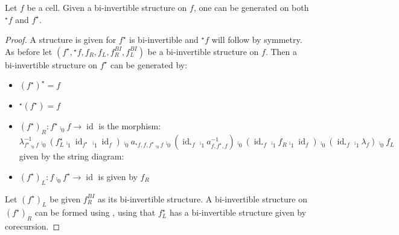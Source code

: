 \documentclass[draft]{article}
\theoremstyle{definition} \newtheorem{definition}{Definition}
\theoremstyle{remark} \newtheorem{remark}{Remark}
\DeclareMathOperator{\id}{id}
\newcommand{\linv}[1]{{}^\star\!#1} \newcommand{\rinv}[1]{#1^\star}
\begin{document}
\begin{lemma}\label{inverses}
  Let \(f\) be a cell. Given a bi-invertible structure on \(f\), one
  can be generated on both \(\linv f\) and \(\rinv f\).
\end{lemma}
\begin{proof}
  A structure is given for \(\rinv f\) is bi-invertible and \(\linv
  f\) will follow by symmetry. As before let \((\rinv f, \linv f, f_R,
  f_L, f_R^{BI}, f_L^{BI})\) be a bi-invertible structure on \(f\).
  Then a bi-invertible structure on \(\rinv f\) can be generated by:
  \begin{itemize}
  \item \(\rinv {(\rinv f)} = f\)
  \item \(\linv {(\rinv f)} = f\)
  \item \({(\rinv f)}_R: \rinv f \comp_0 f \to \id\) is the morphism:
    \begin{equation*}
      \lambda_{\rinv f \comp_0 f}^{-1} \comp_0 (\rinv {f_L} \comp_1 \id_{\rinv f} \comp_1 \id_f) \comp_0 a_{\linv f, f, \rinv f \comp_0 f} \comp_0 (\id_{\linv f} \comp_1 a_{f, \rinv f, f}^{-1}) \comp_0 (\id_{\linv f} \comp_1 f_R \comp_1 \id_f) \comp_0 (\id_{\linv f} \comp_1 \lambda_f) \comp_0 f_L
    \end{equation*}
    given by the string diagram:
    \begin{center}
    \end{center}
  \item \({(\rinv f)}_L: f \comp_0 \rinv f \to \id\) is given by
    \(f_R\)
  \end{itemize}
  Let \({(\rinv f)}_L\) be given \(f_R^{BI}\) as its bi-invertible
  structure. A bi-invertible structure on \({(\rinv f)}_R\) can be
  formed using , using that \(\rinv {f_L}\)
  has a bi-invertible structure given by corecursion.
\end{proof}
\end{document}
